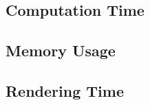         \subsection{Computation Time} \label{sub:computation_time}

        \subsection{Memory Usage} \label{sub:memory_usage}

        \subsection{Rendering Time} \label{sub:rendering_time}


